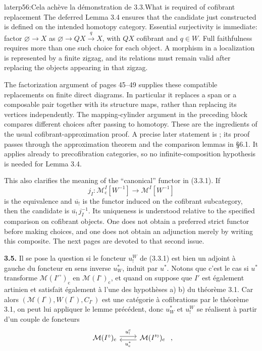 \begin{dcomment}{later}{p56:Cela achève la démonstration de 3.3.}{What is required of cofibrant replacement}
The deferred Lemma 3.4 ensures that the candidate just constructed is defined on the intended homotopy category. Essential surjectivity is immediate: factor $\varnothing\to X$ as $\varnothing\to QX\xrightarrow{q}X$, with $QX$ cofibrant and $q\in W$. Full faithfulness requires more than one such choice for each object. A morphism in a localization is represented by a finite zigzag, and its relations must remain valid after replacing the objects appearing in that zigzag.

The factorization argument of pages 45--49 supplies these compatible replacements on finite direct diagrams. In particular it replaces a span or a composable pair together with its structure maps, rather than replacing its vertices independently. The mapping-cylinder argument in the preceding block compares different choices after passing to homotopy. These are the ingredients of the usual cofibrant-approximation proof. A precise later statement is \citet[Theorem 6.1.6(1)]{RadulescuBanu2009}; its proof passes through the approximation theorem and the comparison lemmas in \S6.1. It applies already to precofibration categories, so no infinite-composition hypothesis is needed for Lemma 3.4.

This also clarifies the meaning of the ``canonical'' functor in (3.3.1). If
\[
 j_I:\mathcal M^I_{\mathrm c}[W^{-1}]
          \longrightarrow\mathcal M^I[W^{-1}]
\]
is the equivalence and $\overline{u_!}$ is the functor induced on the cofibrant subcategory, then the candidate is $\overline{u_!}\,j_I^{-1}$. Its uniqueness is understood relative to the specified comparison on cofibrant objects. One does not obtain a preferred strict functor before making choices, and one does not obtain an adjunction merely by writing this composite. The next pages are devoted to that second issue.
\end{dcomment}


\textbf{3.5.} Il se pose la question si le foncteur $u_!^W$ de (3.3.1) est bien un adjoint à gauche
du foncteur en sens inverse $u^*_W$, induit par $u^*$. Notons que c'est le cas si $u^*$ transforme $\mathcal{M}(I'^\circ)_{\mathrm{c}}$ en $\mathcal{M}(I^\circ)_{\mathrm{c}}$, et quand on suppose que $I'$ est également artinien et satisfait également à l'une des hypothèses a) b) du théorème 3.1. Car alors $(\mathcal{M}(I^\circ),W(I^\circ),C_{I^\circ})$ est une catégorie à cofibrations par le théorème 3.1, on peut lui appliquer le lemme précédent, donc $u^*_W$ et $u_!^W$ se réalisent à partir d'un couple de foncteurs
\[
\begin{tikzcd}
\mathcal{M}(I^\circ)_{\mathrm{c}} \arrow[r, shift left, "u_{!}^{\mathrm{c}}"] & \mathcal{M}(I'^\circ)_{\mathrm{c}} \arrow[l, shift left, "u_{\mathrm{c}}^*"]
\end{tikzcd}\ ,
\]

